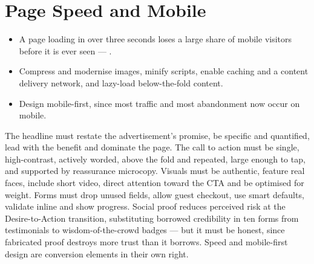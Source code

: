 \documentclass{MMTextbook}
\begin{document}
\section{Page Speed and Mobile}

\begin{itemize}
\item A page loading in over three seconds loses a large share of mobile visitors
      before it is ever seen --- .
\item Compress and modernise images, minify scripts, enable caching and a content
      delivery network, and lazy-load below-the-fold content.
\item Design mobile-first, since most traffic and most abandonment now occur on
      mobile.
\end{itemize}

\begin{summarybox}
The headline must restate the advertisement's promise, be specific and quantified,
lead with the benefit and dominate the page. The call to action must be single,
high-contrast, actively worded, above the fold and repeated, large enough to tap,
and supported by reassurance microcopy. Visuals must be authentic, feature real
faces, include short video, direct attention toward the CTA and be optimised for
weight. Forms must drop unused fields, allow guest checkout, use smart defaults,
validate inline and show progress. Social proof reduces perceived risk at the
Desire-to-Action transition, substituting borrowed credibility in ten forms from
testimonials to wisdom-of-the-crowd badges --- but it must be honest, since
fabricated proof destroys more trust than it borrows. Speed and mobile-first design
are conversion elements in their own right.
\end{summarybox}




\backmatter
\printindex
\end{document}
